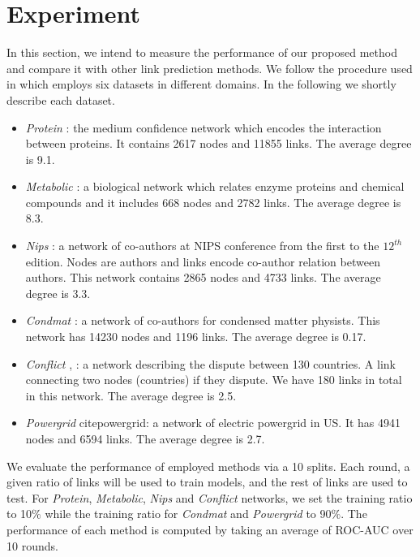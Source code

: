 \documentclass[runningheads,a4paper]{llncs}
\begin{document}
\section{Experiment}
In this section, we intend to measure the performance of our proposed method and compare it with other link prediction methods. We follow the procedure used in \cite{matrix-factorization} which employs six datasets in different domains. In the following we shortly describe each dataset.
\begin{itemize}
\item \textit{Protein }\cite{protein-protein}: the medium confidence network which encodes the interaction between proteins. It contains 2617 nodes and 11855 links. The average degree is 9.1.

\item \textit{Metabolic} \cite{metabolic}: a biological network which relates enzyme proteins and chemical compounds and it includes 668 nodes and 2782 links. The average degree is 8.3.

\item \textit{Nips} \cite{nips}: a network of co-authors at NIPS conference from the first to the $12^{th}$ edition. Nodes are authors and links encode co-author relation between authors. This network contains 2865 nodes and 4733 links. The average degree is 3.3.

\item \textit{Condmat} \cite{condmat}: a network of co-authors for condensed matter physists. This network has 14230 nodes and 1196 links. The average degree is 0.17.

\item \textit{Conflict} \cite{conflict1}, \cite{conflict2}: a network describing the dispute between 130 countries. A link connecting two nodes (countries) if they dispute. We have 180 links in total in this network. The average degree is 2.5.

\item \textit{Powergrid} cite{powergrid}: a network of electric powergrid in US. It has 4941 nodes and 6594 links. The average degree is 2.7.
\end{itemize}

We evaluate the performance of employed methods via a 10 splits. Each round, a given ratio of links will be used to train models, and the rest of links are used to test. For \textit{Protein}, \textit{Metabolic}, \textit{Nips} and \textit{Conflict} networks, we set the training ratio to 10$\%$ while the training ratio for \textit{Condmat} and \textit{Powergrid} to 90$\%$. The performance of each method is computed by taking an average of ROC-AUC over 10 rounds.
\end{document}
